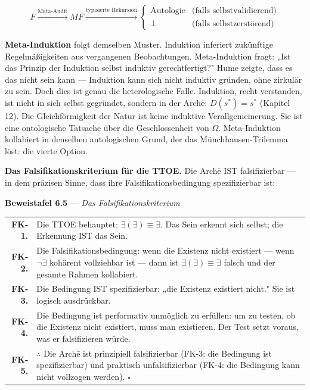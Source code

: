 \documentclass[10pt, openany, oneside]{book}
\renewcommand{\footnotesize}{\fontsize{8.5}{11}\selectfont}
\begin{document}
$$F \xrightarrow{\text{Meta-Audit}} MF \xrightarrow{\text{typisierte Rekursion}} \begin{cases} \text{Autologie} & \text{(falls selbstvalidierend)} \\ \bot & \text{(falls selbstzerstörend)} \end{cases}$$

\textbf{Meta-Induktion} folgt demselben Muster. Induktion inferiert zukünftige Regelmäßigkeiten aus vergangenen Beobachtungen. Meta-Induktion fragt: „Ist das Prinzip der Induktion selbst induktiv gerechtfertigt?" Hume zeigte, dass es das nicht sein kann --- Induktion kann sich nicht induktiv gründen, ohne zirkulär zu sein. Doch dies ist genau die heterologische Falle. Induktion, recht verstanden, ist nicht in sich selbst gegründet, sondern in der Arch\={e}: $D(s^*) = s^*$ (Kapitel 12). Die Gleichförmigkeit der Natur ist keine induktive Verallgemeinerung. Sie ist eine ontologische Tatsache über die Geschlossenheit von $\Omega$. Meta-Induktion kollabiert in denselben autologischen Grund, der das Münchhausen-Trilemma löst: die vierte Option.

\textbf{Das Falsifikationskriterium für die TTOE.} Die Arch\={e} IST falsifizierbar --- in dem präzisen Sinne, dass ihre Falsifikationsbedingung spezifizierbar ist:

\vspace{0.5em}

\textbf{Beweistafel 6.5} --- \textit{Das Falsifikationskriterium}

\vspace{0.5em}

{\footnotesize
\noindent\begin{tabular}{r p{}}
\textbf{FK-1.} & Die TTOE behauptet: $\exists(\exists) \equiv \exists$. Das Sein erkennt sich selbst; die Erkennung IST das Sein. \\[0.3em]
\textbf{FK-2.} & Die Falsifikationsbedingung: wenn die Existenz nicht existiert --- wenn $\neg\exists$ kohärent vollziehbar ist --- dann ist $\exists(\exists) \equiv \exists$ falsch und der gesamte Rahmen kollabiert. \\[0.3em]
\textbf{FK-3.} & Die Bedingung IST spezifizierbar: „die Existenz existiert nicht." Sie ist logisch ausdrückbar. \\[0.3em]
\textbf{FK-4.} & Die Bedingung ist performativ unmöglich zu erfüllen: um zu testen, ob die Existenz nicht existiert, muss man existieren. Der Test setzt voraus, was er falsifizieren würde. \\[0.3em]
\textbf{FK-5.} & $\therefore$ Die Arch\={e} ist prinzipiell falsifizierbar (FK-3: die Bedingung ist spezifizierbar) und praktisch unfalsifizierbar (FK-4: die Bedingung kann nicht vollzogen werden). $\square$ \\[0.3em]
\end{tabular}
}
\end{document}
